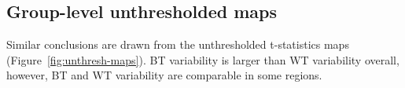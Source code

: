   \begin{figure}[ht]
  \end{figure}



\subsection{Group-level unthresholded maps}

Similar conclusions are drawn from the unthresholded t-statistics maps
(Figure~\ref{fig:unthresh-maps}). BT variability is larger than WT variability overall, however,
BT and WT variability are comparable in some regions. 


